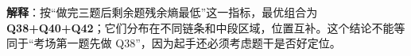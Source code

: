 \textbf{解释}：按“做完三题后剩余题残余熵最低”这一指标，最优组合为\textbf{Q38+Q40+Q42}；它们分布在不同链条和中段区域，位置互补。这个结论不能等同于“考场第一题先做 Q38”，因为起手还必须考虑题干是否好定位。